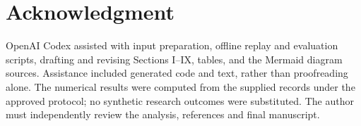 \documentclass[conference]{IEEEtran}
\begin{document}
\section*{Acknowledgment}
OpenAI Codex assisted with input preparation, offline replay and evaluation scripts, drafting and revising Sections I--IX, tables, and the Mermaid diagram sources. Assistance included generated code and text, rather than proofreading alone. The numerical results were computed from the supplied records under the approved protocol; no synthetic research outcomes were substituted. The author must independently review the analysis, references and final manuscript.



\end{document}
